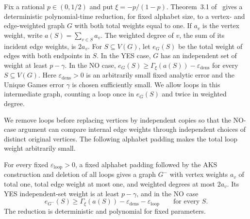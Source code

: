 Fix a rational $p\in(0,1/2)$ and put $\xi=-p/(1-p)$.
Theorem~3.1 of~\cite{AKS2011} gives a deterministic polynomial-time
reduction, for fixed alphabet size, to a vertex- and edge-weighted
graph $G$ with both total weights equal to one. If $a_v$ is the
vertex weight, write $a(S)=\sum_{v\in S}a_v$. The weighted degree
of $v$, the sum of its incident edge weights, is $2a_v$. For
$S\subseteq V(G)$, let $e_G(S)$ be the total weight of edges with
both endpoints in $S$. In the YES case,
$G$ has an independent set of weight at least $p-\gamma$. In the
NO case, $e_G(S)\ge\Gamma_\xi(a(S))-\varepsilon_{\mathrm{dens}}$ for every
$S\subseteq V(G)$. Here $\varepsilon_{\mathrm{dens}}>0$ is an arbitrarily small fixed analytic error
and the Unique Games error $\gamma$ is chosen sufficiently small. We allow loops in this
intermediate graph, counting a loop once in $e_G(S)$ and twice in
weighted degree.

We remove loops before replacing vertices by independent copies so that the NO-case
argument can compare internal edge weights through independent
choices of distinct original vertices. The following alphabet
padding makes the total loop weight arbitrarily small.

\begin{lemma}\label{lem:aks-loop-removal}
For every fixed $\varepsilon_{\mathrm{loop}}>0$, a fixed alphabet padding followed by the
AKS construction and deletion of all loops gives a graph $G^-$
with vertex weights $a_v$ of total one, total edge weight at most
one, and weighted degrees at most $2a_v$.
Its YES independent-set weight is at least $p-\gamma$, and in the
NO case
\begin{equation}\label{eq:aks-loop-free-density}
 e_{G^-}(S)\ge\Gamma_\xi(a(S))-\varepsilon_{\mathrm{dens}}-\varepsilon_{\mathrm{loop}}
 \qquad\text{for every }S.
\end{equation}
The reduction is deterministic and polynomial for fixed parameters.
\end{lemma}

